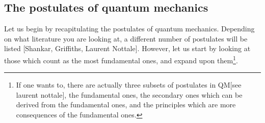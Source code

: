 \subsection{The postulates of quantum mechanics}
Let us begin by recapitulating the postulates of quantum mechanics. Depending on what literature you are looking at, a different number of postulates will be listed [Shankar\cite{Shankar}, Griffiths\cite{griffiths:quantum}, Laurent Nottale\cite{Nottale:2007ne}]. However, let us start by looking at those which count as the most fundamental ones, and expand upon them\footnote{If one wants to, there are actually three subsets of postulates in QM[see laurent nottale], the fundamental ones, the secondary ones which can be derived from the fundamental ones, and the principles which are more consequences of the fundamental ones.}.

